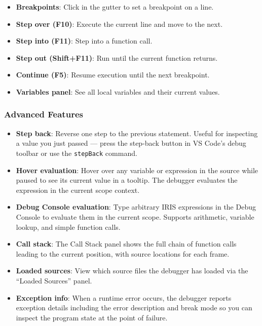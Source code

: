 \documentclass[
  english,
]{book}
\providecommand{\tightlist}{%
  \setlength{\itemsep}{0pt}\setlength{\parskip}{0pt}}
\begin{document}
\begin{itemize}
\tightlist
\item
  \textbf{Breakpoints}: Click in the gutter to set a breakpoint on a
  line.
\item
  \textbf{Step over (F10)}: Execute the current line and move to the
  next.
\item
  \textbf{Step into (F11)}: Step into a function call.
\item
  \textbf{Step out (Shift+F11)}: Run until the current function returns.
\item
  \textbf{Continue (F5)}: Resume execution until the next breakpoint.
\item
  \textbf{Variables panel}: See all local variables and their current
  values.
\end{itemize}

\subsubsection{Advanced Features}\label{advanced-features}

\begin{itemize}
\tightlist
\item
  \textbf{Step back}: Reverse one step to the previous statement. Useful
  for inspecting a value you just passed --- press the step-back button
  in VS Code's debug toolbar or use the \texttt{stepBack} command.
\item
  \textbf{Hover evaluation}: Hover over any variable or expression in
  the source while paused to see its current value in a tooltip. The
  debugger evaluates the expression in the current scope context.
\item
  \textbf{Debug Console evaluation}: Type arbitrary IRIS expressions in
  the Debug Console to evaluate them in the current scope. Supports
  arithmetic, variable lookup, and simple function calls.
\item
  \textbf{Call stack}: The Call Stack panel shows the full chain of
  function calls leading to the current position, with source locations
  for each frame.
\item
  \textbf{Loaded sources}: View which source files the debugger has
  loaded via the ``Loaded Sources'' panel.
\item
  \textbf{Exception info}: When a runtime error occurs, the debugger
  reports exception details including the error description and break
  mode so you can inspect the program state at the point of failure.
\end{itemize}
\end{document}
